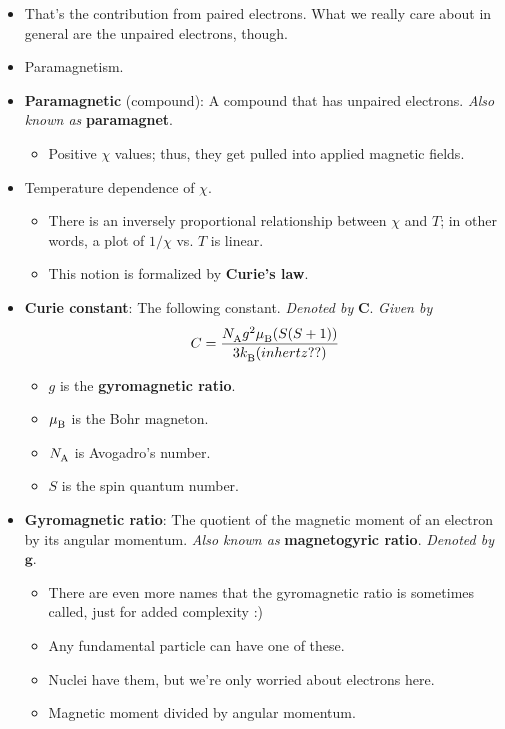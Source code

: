 \documentclass[../notes.tex]{subfiles}
\begin{document}
\begin{itemize}
    \item That's the contribution from paired electrons. What we really care about in general are the unpaired electrons, though.
    \item Paramagnetism.
    \item \textbf{Paramagnetic} (compound): A compound that has unpaired electrons. \emph{Also known as} \textbf{paramagnet}.
    \begin{itemize}
        \item Positive $\chi$ values; thus, they get pulled into applied magnetic fields.
    \end{itemize}
    \item Temperature dependence of $\chi$.
    \begin{itemize}
        \item There is an inversely proportional relationship between $\chi$ and $T$; in other words, a plot of $1/\chi$ vs. $T$ is linear.
        \item This notion is formalized by \textbf{Curie's law}.
    \end{itemize}
    \item \textbf{Curie constant}: The following constant. \emph{Denoted by} $\bm{C}$. \emph{Given by}
    \begin{equation*}
        C = \frac{{N_\text{A}^{}} g^2{\mu_\text{B}^{}}(S(S+1))}{3{k_\text{B}^{}} (in hertz??)}
    \end{equation*}
    \begin{itemize}
        \item $g$ is the \textbf{gyromagnetic ratio}.
        \item ${\mu_\text{B}^{}}$ is the Bohr magneton.
        \item ${N_\text{A}^{}}$ is Avogadro's number.
        \item $S$ is the spin quantum number.
    \end{itemize}
    \item \textbf{Gyromagnetic ratio}: The quotient of the magnetic moment of an electron by its angular momentum. \emph{Also known as} \textbf{magnetogyric ratio}. \emph{Denoted by} $\bm{g}$.
    \begin{itemize}
        \item There are even more names that the gyromagnetic ratio is sometimes called, just for added complexity :)
        \item Any fundamental particle can have one of these.
        \item Nuclei have them, but we're only worried about electrons here.
        \item Magnetic moment divided by angular momentum.

\end{itemize}
\end{itemize}
\end{document}
